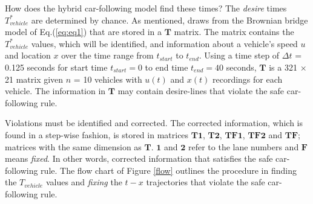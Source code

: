 \documentclass[Proceedings]{ascelike}
\begin{document}
How does the hybrid car-following model find these times? The  \emph{desire}  times  $T_{vehicle}^*$ are determined by chance. As mentioned, draws from the Brownian bridge model of Eq.(\ref{eq:eq1}) that are stored in a $\mathbf{T}$ matrix. The matrix contains the $T_{vehicle}^*$ values, which will be identified, and  information about a vehicle's speed $u$ and location $x$ over the time range from $t_{start}$ to $t_{end}$. Using a time step of $\Delta t$ = 0.125 seconds for start time $t_{start} = 0$ to end time $t_{end} = 40$ seconds, $\mathbf{T}$  is a  321 $\times$ 21 matrix given $n$ = 10 vehicles with  $u(t)$ and $x(t)$ recordings for each vehicle.  The information in $\mathbf{T}$ may contain desire-lines that violate the safe car-following rule. 

Violations must be identified and corrected. The corrected information, which is found in a step-wise fashion,  is stored in matrices $\mathbf{T1}$, $\mathbf{T2}$, $\mathbf{TF1}$, $\mathbf{TF2}$ and $\mathbf{TF}$; matrices with the same dimension as $\mathbf{T}$. $\mathbf{1}$ and $\mathbf{2}$ refer to the lane numbers and $\mathbf{F}$ means \emph{fixed}.  In other words, corrected information that satisfies the safe car-following rule.  The flow chart of Figure \ref{flow} outlines the procedure in finding the  $T_{vehicle}$ values and \emph{fixing} the $t-x$ trajectories that violate the safe car-following rule.
\end{document}
